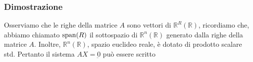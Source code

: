 \documentclass[../main.tex]{subfiles}
\begin{document}
\subsubsection{Dimostrazione}
Osserviamo che le righe della matrice $A$ sono vettori di $\mathbb{R}^R (\mathbb{R})$, ricordiamo che, abbiamo chiamato $\operatorname{span}(R)$ il sottospazio di $\mathbb{R}^n (\mathbb{R})$ generato dalla righe della matrice $A$. Inoltre, $\mathbb{R}^n (\mathbb{R})$, spazio euclideo reale, è dotato di prodotto scalare std. Pertanto il sistema $AX = \underbar{0}$ può essere scritto
\end{document}
